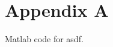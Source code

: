\documentclass[a4paper]{article}
\begin{document}


\clearpage
\appendix

\clearpage
\section*{Appendix A}\label{code:asdf}

Matlab code for asdf.

%
\end{document}
